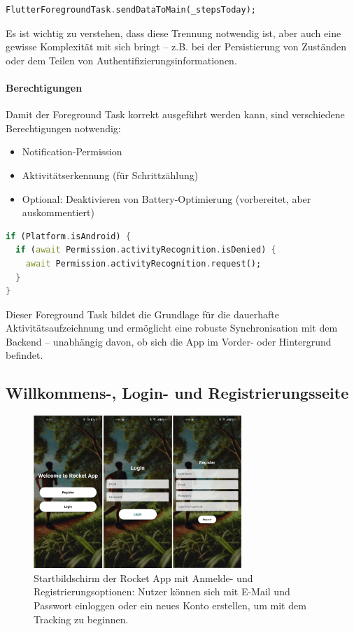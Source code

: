 \documentclass[11pt,a4paper]{article}
\begin{document}
\begin{lstlisting}[language=Dart, caption=Schritte an Hauptprozess senden]
FlutterForegroundTask.sendDataToMain(_stepsToday);
\end{lstlisting}

Es ist wichtig zu verstehen, dass diese Trennung notwendig ist, aber auch eine gewisse Komplexität mit sich bringt – z.B. bei der Persistierung von Zuständen oder dem Teilen von Authentifizierungsinformationen.

\paragraph{Berechtigungen}
Damit der Foreground Task korrekt ausgeführt werden kann, sind verschiedene Berechtigungen notwendig:

\begin{itemize}
    \item Notification-Permission
    \item Aktivitätserkennung (für Schrittzählung)
    \item Optional: Deaktivieren von Battery-Optimierung (vorbereitet, aber auskommentiert)
\end{itemize}

\begin{lstlisting}[language=Dart, caption=Abfrage der Berechtigungen]
if (Platform.isAndroid) {
  if (await Permission.activityRecognition.isDenied) {
    await Permission.activityRecognition.request();
  }
}
\end{lstlisting}

Dieser Foreground Task bildet die Grundlage für die dauerhafte Aktivitätsaufzeichnung und ermöglicht eine robuste Synchronisation mit dem Backend – unabhängig davon, ob sich die App im Vorder- oder Hintergrund befindet.

\subsection{Willkommens-, Login- und Registrierungsseite}

\begin{figure}[H]
    \centering
    \includegraphics[width=0.7\textwidth]{images/apps/welcome-login-register-page.jpg}
    \caption{Startbildschirm der Rocket App mit Anmelde- und Registrierungsoptionen: Nutzer können sich mit E-Mail und Passwort einloggen oder ein neues Konto erstellen, um mit dem Tracking zu beginnen.}
    \label{fig:validation-workflow}
\end{figure}
\end{document}
